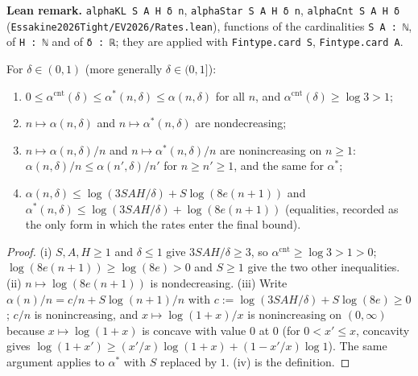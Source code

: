 \textbf{Lean remark.} \texttt{alphaKL S A H δ n}, \texttt{alphaStar S A H δ n},
\texttt{alphaCnt S A H δ} (\texttt{Essakine2026Tight/EV2026/Rates.lean}), functions of the
cardinalities \texttt{S A : ℕ}, of \texttt{H : ℕ} and of \texttt{δ : ℝ}; they are applied
with \texttt{Fintype.card S}, \texttt{Fintype.card A}.

\begin{lemma}\label{lem:rates_props}
\leanok
For $\delta \in (0, 1)$ (more generally $\delta \in (0, 1]$):
\begin{enumerate}
  \item[(i)] $0 \le \alpha^{\mathrm{cnt}}(\delta) \le \alpha^*(n, \delta) \le \alpha(n, \delta)$ for all $n$,
        and $\alpha^{\mathrm{cnt}}(\delta) \ge \log 3 > 1$;
  \item[(ii)] $n \mapsto \alpha(n, \delta)$ and $n \mapsto \alpha^*(n, \delta)$ are nondecreasing;
  \item[(iii)] $n \mapsto \alpha(n, \delta)/n$ and $n \mapsto \alpha^*(n, \delta)/n$ are nonincreasing on
        $n \ge 1$: $\alpha(n, \delta)/n \le \alpha(n', \delta)/n'$ for $n \ge n' \ge 1$, and the same for $\alpha^*$;
  \item[(iv)] $\alpha(n, \delta) \le \log(3SAH/\delta) + S \log(8e(n + 1))$ and
        $\alpha^*(n, \delta) \le \log(3SAH/\delta) + \log(8e(n + 1))$ (equalities, recorded as the
        only form in which the rates enter the final bound).
\end{enumerate}
\end{lemma}

\begin{proof}
\leanok
{}
(i) $S, A, H \ge 1$ and $\delta \le 1$ give $3SAH/\delta \ge 3$, so $\alpha^{\mathrm{cnt}} \ge \log 3 > 1 > 0$;
$\log(8e(n + 1)) \ge \log(8e) > 0$ and $S \ge 1$ give the two other inequalities.
(ii) $n \mapsto \log(8e(n + 1))$ is nondecreasing. (iii) Write $\alpha(n)/n = c/n + S \log(n + 1)/n$
with $c := \log(3SAH/\delta) + S \log(8e) \ge 0$; $c/n$ is nonincreasing, and $x \mapsto \log(1 + x)/x$
is nonincreasing on $(0, \infty)$ because $x \mapsto \log(1 + x)$ is concave with value $0$ at
$0$ (for $0 < x' \le x$, concavity gives $\log(1 + x') \ge (x'/x)\log(1 + x) + (1 - x'/x)\log 1$).
The same argument applies to $\alpha^*$ with $S$ replaced by $1$. (iv) is the definition.
\end{proof}

